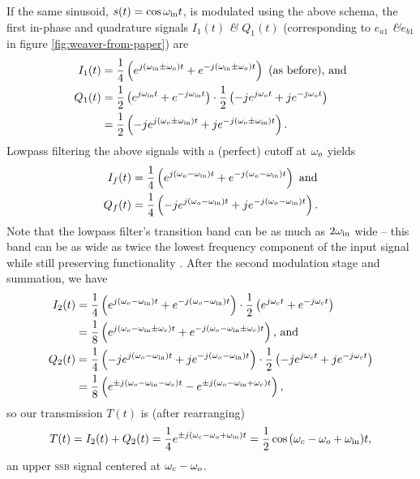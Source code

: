 \documentclass[12pt]{article}
\newcommand{\amp}{\textit{\&}\xspace}
\newcommand{\ssb}{\textsc{ssb}\xspace}
\begin{document}
If the same sinusoid, \(s(t) = \cos \omega_\text{in} t\), is modulated using the
above schema, the first in-phase and quadrature signals \(I_1(t)\) \amp
\(Q_1(t)\) (corresponding to \(e_{a1}\) \amp \(e_{b1}\) in figure
\ref{fig:weaver-from-paper}) are
\begin{align*}
	I_1(t) &= \frac 1 4 \left(
			e^{j (\omega_\text{in} \pm \omega_o) t} + e^{-j (\omega_\text{in} \pm \omega_o) t}
		\right) \text{ (as before), and} \\
	Q_1(t) &= \frac 1 2 \left(e^{j \omega_\text{in} t} + e^{-j \omega_\text{in} t}\right)
			\cdot \frac 1 2 \left(
				-j e^{j \omega_o t} + j e^{-j \omega_o t}\right
			) \\
		&= \frac 1 2 \left(
			-j e^{j (\omega_o \pm \omega_\text{in}) t} + j e^{-j (\omega_o \pm \omega_\text{in}) t}
		\right).
\end{align*}
Lowpass filtering the above signals with a (perfect) cutoff at \(\omega_o\) yields
\begin{align*}
	I_f(t) &= \frac 1 4 \left(
			e^{j (\omega_o - \omega_\text{in}) t} + e^{-j (\omega_o - \omega_\text{in}) t}
		\right) \text{ and} \\
	Q_f(t) &= \frac 1 4 \left(
			-j e^{j (\omega_o - \omega_\text{in}) t} + j e^{-j (\omega_o - \omega_\text{in}) t}
		\right).
\end{align*}
Note that the lowpass filter's transition band can be as much as \(2 \omega_\text{in}\)
wide -- this band can be as wide as twice the lowest frequency component of the
input signal while still preserving functionality \autocite{weaver-rowell}.
After the second modulation stage and summation, we have
\begin{align*}
	I_2(t) &= \frac 1 4 \left(
			e^{j (\omega_o - \omega_\text{in}) t} + e^{-j (\omega_o - \omega_\text{in}) t}
		\right) \cdot \frac 1 2 \left(
			e^{j \omega_c t} + e^{-j \omega_c t}
		\right) \\
		&= \frac 1 8 \left(
			e^{j (\omega_o - \omega_\text{in} \pm \omega_c) t}
			+ e^{-j (\omega_o - \omega_\text{in} \pm \omega_c) t}
		\right) \text{, and} \\
	Q_2(t) &= \frac 1 4 \left(
			-j e^{j (\omega_o - \omega_\text{in}) t} + j e^{-j (\omega_o - \omega_\text{in}) t}
		\right) \cdot \frac 1 2 \left(
			-j e^{j \omega_c t} + j e^{-j \omega_c t}
		\right) \\
		&= \frac 1 8 \left(
			e^{\pm j (\omega_o - \omega_\text{in} - \omega_c) t}
			- e^{\pm j (\omega_o - \omega_\text{in} + \omega_c) t}
		\right),
\end{align*}
so our transmission \(T(t)\) is (after rearranging)
\[
	T(t) = I_2(t) + Q_2(t) = \frac 1 4 e^{\pm j (\omega_c - \omega_o + \omega_\text{in}) t}
		= \frac 1 2 \cos\, (\omega_c - \omega_o + \omega_\text{in}) t,
\]
an upper \ssb signal centered at \(\omega_c - \omega_o\).

\printbibliography
\end{document}
